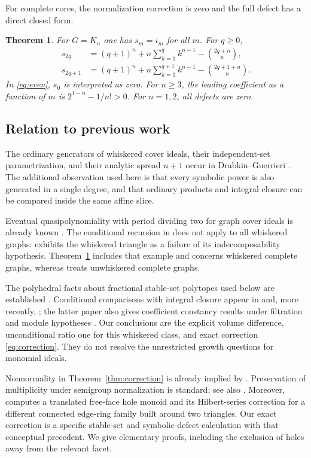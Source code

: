 \documentclass[11pt]{article}
\newtheorem{theorem}{Theorem}[section]
\theoremstyle{remark}
\begin{document}
For complete cores, the normalization correction is zero and the full
defect has a direct closed form.

\begin{theorem}\label{thm:complete}
For $G=K_n$ one has $s_m=i_m$ for all $m$. For $q\geq0$,
\begin{align}
s_{2q}&=(q+1)^n+n\sum_{k=1}^q k^{n-1}-\binom{2q+n}{n},\label{eq:even}\\
s_{2q+1}&=(q+1)^n+n\sum_{k=1}^{q+1}k^{n-1}
-\binom{2q+1+n}{n}.\label{eq:odd}
\end{align}
In \eqref{eq:even}, $s_0$ is interpreted as zero. For $n\geq3$, the
leading coefficient as a function of $m$ is $2^{1-n}-1/n!>0$. For
$n=1,2$, all defects are zero.
\end{theorem}

\subsection*{Relation to previous work}
The ordinary generators of whiskered cover ideals, their independent-set
parametrization, and their analytic spread $n+1$ occur in
Drabkin--Guerrieri \cite[Proposition~5.7 and Theorem~5.8]{DGFreiman}.
The additional observation used here is that every symbolic power is
also generated in a single degree, and that ordinary products and integral
closure can be compared inside the same affine slice.

Eventual quasipolynomiality with period dividing two for graph cover
ideals is already known \cite[Corollary~4.3]{DG}. The conditional recursion
in \cite[Theorem~5.5]{DG} does not apply to all whiskered graphs:
\cite[Remark~5.3]{DG} exhibits the whiskered triangle as a failure of its
indecomposability hypothesis. Theorem~\ref{thm:complete} includes that
example and concerns whiskered complete graphs, whereas
\cite[Theorem~5.7]{DG} treats unwhiskered complete graphs.

The polyhedral facts about fractional stable-set polytopes used below
are established \cite{HHO}. Conditional comparisons with integral closure
appear in \cite[Proposition~4.5]{Oltsik} and, more recently,
\cite[Theorem~4.1]{BHL}; the latter paper also gives coefficient constancy
results under filtration and module hypotheses
\cite[Theorem~4.2]{BHL}. Our conclusions are the explicit volume difference,
unconditional ratio one for this whiskered class, and exact correction
\eqref{eq:correction}. They do not resolve the unrestricted growth
questions for monomial ideals.

Nonnormality in Theorem~\ref{thm:correction} is already implied by
\cite[Theorem~1]{MOS}. Preservation of multiplicity under semigroup
normalization is standard; see also \cite[Proposition~3.1]{Higashitani}.
Moreover, \cite[Proposition~4.2]{Higashitani} computes a translated free-face
hole monoid and its Hilbert-series correction for a different connected
edge-ring family built around two triangles. Our exact correction is a
specific stable-set and symbolic-defect calculation with that conceptual
precedent. We give elementary proofs, including the exclusion of holes
away from the relevant facet.
\end{document}
